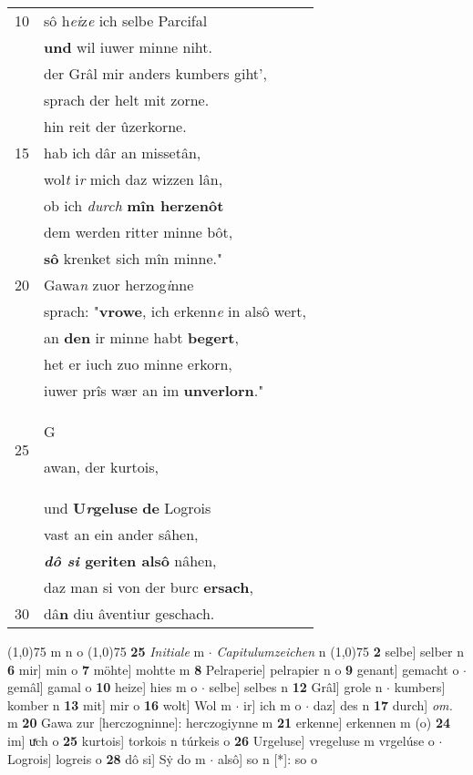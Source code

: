 \documentclass[8pt,a4paper,notitlepage]{article}
\begin{document}
\begin{table}[ht]
\begin{minipage}[t]{0.5\linewidth}
\begin{tabular}{rl}
10 & sô h\textit{ei}z\textit{e} ich selbe Parcifal\\ 
 & \textbf{und} wil iuwer minne niht.\\ 
 & der Grâl mir anders kumbers giht',\\ 
 & sprach der helt mit zorne.\\ 
 & hin reit der ûzerkorne.\\ 
15 & hab ich dâr an missetân,\\ 
 & wol\textit{t} i\textit{r} mich daz wizzen lân,\\ 
 & ob ich \textit{durch} \textbf{mîn herzenôt}\\ 
 & dem werden ritter minne bôt,\\ 
 & \textbf{sô} krenket sich mîn minne."\\ 
20 & Gawa\textit{n} zuor herzog\textit{i}nne\\ 
 & sprach: "\textbf{vrowe}, ich erkenn\textit{e} in alsô wert,\\ 
 & an \textbf{den} ir minne habt \textbf{begert},\\ 
 & het er iuch zuo minne erkorn,\\ 
 & iuwer prîs wær an im \textbf{unverlorn}."\\ 
25 & \begin{large}G\end{large}awan, der kurtois,\\ 
 & und \textbf{U\textit{r}geluse} \textbf{de} Logrois\\ 
 & vast an ein ander sâhen,\\ 
 & \textbf{\textit{dô si} geriten alsô} nâhen,\\ 
 & daz man si von der burc \textbf{ersach},\\ 
30 & dâ\textbf{n} diu âventiur geschach.\\ 
\end{tabular}
\scriptsize
\line(1,0){75} \newline
m n o \newline
\line(1,0){75} \newline
\textbf{25} \textit{Initiale} m   $\cdot$ \textit{Capitulumzeichen} n  \newline
\line(1,0){75} \newline
\textbf{2} selbe] selber n \textbf{6} mir] min o \textbf{7} möhte] mohtte m \textbf{8} Pelraperie] pelrapier n o \textbf{9} genant] gemacht o  $\cdot$ gemâl] gamal o \textbf{10} heize] hies m o  $\cdot$ selbe] selbes n \textbf{12} Grâl] grole n  $\cdot$ kumbers] komber n \textbf{13} mit] mir o \textbf{16} wolt] Wol m  $\cdot$ ir] ich m o  $\cdot$ daz] des n \textbf{17} durch] \textit{om.} m \textbf{20} Gawa zur [herczogninne]: herczogiynne m \textbf{21} erkenne] erkennen m (o) \textbf{24} im] uͯch o \textbf{25} kurtois] torkois n túrkeis o \textbf{26} Urgeluse] vregeluse m vrgelúse o  $\cdot$ Logrois] logreis o \textbf{28} dô si] Sẏ do m  $\cdot$ alsô] so n [*]: so o \newline
\end{minipage}
\end{table}
\end{document}
